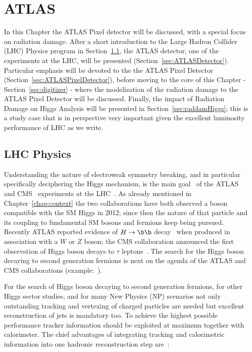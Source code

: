 \chapter{ATLAS}
\label{chap:ATLAS}

In this Chapter the ATLAS Pixel detector will be discussed, with a special focus on radiation
 damage. 
After a short introduction to the Large Hadron Collider (LHC) Physics program in 
Section~\ref{sec:LHCPhysics}, the ATLAS detector, one of the experiments at the LHC, will be 
presented (Section~\ref{sec:ATLASDetector}). Particular emphasis will be devoted to the 
the ATLAS Pixel Detector (Section~\ref{sec:ATLASPixelDetector}), before moving to the 
core of this Chapter - Section~\ref{sec:digitizer} -
 where the modelization of the radiation damage to the ATLAS Pixel 
Detector will be discussed. Finally, the impact of Radiation Damage on Higgs Analysis 
will be presented in Section~\ref{sec:raddamHiggs}; this is a study case that is in 
perspective very important given the excellent luminosity performance of LHC as we write.

\section{LHC Physics}
\label{sec:LHCPhysics}
Understanding the nature of electroweak symmetry breaking, and in particular  specifically 
deciphering the Higgs mechanism, is the main goal~\cite{Plehn:2009nd} of the ATLAS~\cite{AtlasDetector} and 
CMS~\cite{CMSDetector} experiments at the LHC~\cite{LHCMachine}. 
As already mentioned in Chapter~\ref{chap:context}
the two collaborations have both observed a boson compatible with the SM Higgs in 2012; 
since then the nature of that particle and its coupling to fundamental SM bosons and fermions 
keep being pursued.  Recently ATLAS reported evidence of $H\to\b\b$ decay~\cite{ATLASHbb2017} 
when produced in association with a $W$ or $Z$ boson; the CMS collaboration announced 
the first observation of Higgs boson decays to $\tau$ leptons~\cite{CMSHtautau2017}. 
The search for the Higgs boson decaying to second generation fermions is next on the 
agenda of the ATLAS and CMS collaborations (example:~\cite{ATLASHmumu2017}).

For the search of Higgs boson decaying to second generation fermions, for other Higgs sector 
studies, and for many New Physics (NP) scenarios not only outstanding tracking and vertexing of charged particles are needed but  excellent reconstruction of jets is mandatory  too. 
To achieve the highest possible performance tracker information should be exploited at maximum 
together with calorimeter. 
The chief advantages of integrating tracking and calorimetric information into one hadronic reconstruction
step are~\cite{ATLASParticleFlow}:

